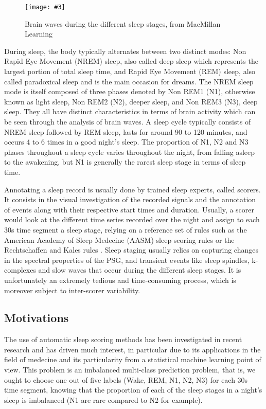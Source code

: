 \documentclass[titlepage, 11pt, a4paper, fancysections]{article}
\newcommand{\fig}[5]{\begin{figure}[#1] \centering \texttt{[image: \#3]} \caption{#4} \label{#5} \end{figure}}
\begin{document}
\fig{h!}{.87\linewidth}{sleep_stages.jpeg}{Brain waves during the different sleep stages, from MacMillan Learning}{fig:sleep_stages}

During sleep, the body typically alternates between two distinct modes: Non Rapid Eye Movement (NREM) sleep, also called deep sleep which represents the largest portion of total sleep time, and Rapid Eye Movement (REM) sleep, also called paradoxical sleep and is the main occasion for dreams. The NREM sleep mode is itself composed of three phases denoted by Non REM1 (N1), otherwise known as light sleep, Non REM2 (N2), deeper sleep, and Non REM3 (N3), deep sleep. They all have distinct characteristics in terms of brain activity which can be seen through the analysis of brain waves. A  sleep cycle typically consists of NREM sleep followed by REM sleep, lasts for around 90 to 120 minutes, and occurs 4 to 6 times in a good night's sleep. The proportion of N1, N2 and N3 phases throughout a sleep cycle varies throughout the night, from falling asleep to the awakening, but N1 is generally the rarest sleep stage in terms of sleep time. 

Annotating a sleep record is usually done by trained sleep experts, called scorers. It consists in the visual investigation of the recorded signals and the annotation of events along with their respective start times and duration. Usually, a scorer would look at the different time series recorded over the night and assign to each 30s time segment a sleep stage, relying on a reference set of rules such as the American Academy of Sleep Medecine (AASM) sleep scoring rules \autocite{AASM} or the Rechtschaffen and Kales rules \autocite{rkmanual}. Sleep staging usually relies on capturing changes in the spectral properties of the PSG, and transient events like sleep spindles, k-complexes and slow waves that occur during the different sleep stages. It is unfortunately an extremely tedious and time-consuming process, which is moreover subject to inter-scorer variability. 

\subsection{Motivations}
The use of automatic sleep scoring methods has been investigated in recent research and has driven much interest, in particular due to its applications in the field of medecine and its particularity from a statistical machine learning point of view. This problem is an imbalanced multi-class prediction problem, that is, we ought to choose one out of five labels (Wake, REM, N1, N2, N3) for each 30s time segment, knowing that the proportion of each of the sleep stages in a night's sleep is imbalanced (N1 are rare compared to N2 for example). 
\end{document}
